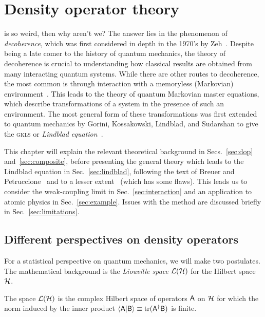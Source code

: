 \documentclass[../thesis.tex]{subfiles}
\begin{document}
\chapter{Density operator theory}

 is so weird, then why aren't we? The answer lies in the
phenomenon of \emph{decoherence}, which was first considered in depth in the
1970's by Zeh~\cite{zeh}. Despite being a late comer to the history of quantum
mechanics, the theory of decoherence is crucial to understanding how classical
results are obtained from many interacting quantum systems. While there are
other routes to decoherence, the most common is through interaction with a
memoryless (Markovian) environment~\cite{decoherence}. This leads to the theory
of quantum Markovian master equations, which describe transformations of a
system in the presence of such an environment. The most general form of these
transformations was first extended to quantum mechanics by Gorini, Kossakowski,
Lindblad, and Sudarshan to give the \textsc{gkls} or \emph{Lindblad
equation}~\cite{gks,lindblad}.

This chapter will explain the relevant theoretical background in
Secs.~\ref{sec:dop} and~\ref{sec:composite}, before presenting the general
theory which leads to the Lindblad equation in Sec.~\ref{sec:lindblad},
following the text of Breuer and Petruccione~\cite{opensys} and to a lesser
extent~\cite{intro} (which has some flaws). This leads us to consider the
weak-coupling limit in Sec.~\ref{sec:interaction} and an application to atomic
physics in Sec.~\ref{sec:example}. Issues with the method are discussed briefly
in Sec.~\ref{sec:limitations}.

\section{Different perspectives on density operators\label{sec:dop}}

For a statistical perspective on quantum mechanics, we will make two postulates.
The mathematical background is the \emph{Liouville space} $\mathcal{L}(\mathcal{H})$ for the
Hilbert space $\mathcal{H}$.
\begin{defn}
  The space $\mathcal{L}(\mathcal{H})$ is the complex Hilbert space of operators $\mathsf{A}$
  on $\mathcal{H}$ for which the norm induced by the inner product
  $\ip{\opr{A}}{\opr{B}} \equiv \tr(\opr{A}^\dag \opr{B})$ is finite.
\end{defn}
\end{document}
